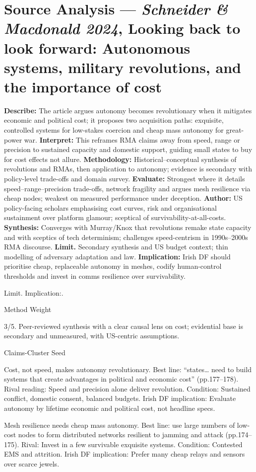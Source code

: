 \section*{Source Analysis — \textit{Schneider & Macdonald 2024}, Looking back to look forward: Autonomous systems, military revolutions, and the importance of cost}
\textbf{Describe:} The article argues autonomy becomes revolutionary when it mitigates economic and political cost; it proposes two acquisition paths: exquisite, controlled systems for low-stakes coercion and cheap mass autonomy for great-power war.
\textbf{Interpret:} This reframes RMA claims away from speed, range or precision to sustained capacity and domestic support, guiding small states to buy for cost effects not allure.
\textbf{Methodology:} Historical–conceptual synthesis of revolutions and RMAs, then application to autonomy; evidence is secondary with policy-level trade-offs and domain survey.
\textbf{Evaluate:} Strongest where it details speed–range–precision trade-offs, network fragility and argues mesh resilience via cheap nodes; weakest on measured performance under deception.
\textbf{Author:} US policy-facing scholars emphasising cost curves, risk and organisational sustainment over platform glamour; sceptical of survivability-at-all-costs.
\textbf{Synthesis:} Converges with Murray/Knox that revolutions remake state capacity and with sceptics of tech determinism; challenges speed-centrism in 1990s–2000s RMA discourse.
\textbf{Limit.} Secondary synthesis and US budget context; thin modelling of adversary adaptation and law.
\textbf{Implication:} Irish DF should prioritise cheap, replaceable autonomy in meshes, codify human-control thresholds and invest in comms resilience over survivability.

Limit. Implication:.

Method Weight

3/5. Peer-reviewed synthesis with a clear causal lens on cost; evidential base is secondary and unmeasured, with US-centric assumptions.

Claims-Cluster Seed

Cost, not speed, makes autonomy revolutionary.
Best line: “states… need to build systems that create advantages in political and economic cost” (pp.177–178).
Rival reading: Speed and precision alone deliver revolution.
Condition: Sustained conflict, domestic consent, balanced budgets.
Irish DF implication: Evaluate autonomy by lifetime economic and political cost, not headline specs.

Mesh resilience needs cheap mass autonomy.
Best line: use large numbers of low-cost nodes to form distributed networks resilient to jamming and attack (pp.174–175).
Rival: Invest in a few survivable exquisite systems.
Condition: Contested EMS and attrition.
Irish DF implication: Prefer many cheap relays and sensors over scarce jewels.

